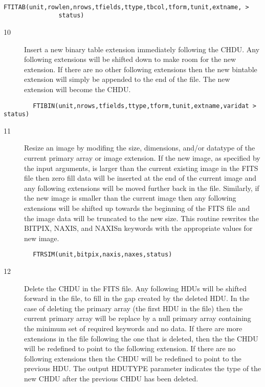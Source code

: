 \documentclass[11pt]{book}
\begin{document}
\begin{verbatim}
        FTITAB(unit,rowlen,nrows,tfields,ttype,tbcol,tform,tunit,extname, >
               status)
\end{verbatim}

\begin{description}
\item[10]  Insert a new binary table extension immediately following the CHDU.
    Any following extensions will be shifted down to make room for
    the new extension.  If there are no other following extensions
    then the new bintable extension will simply be appended to the
   end of the file.  The new extension will become the CHDU.
\end{description}

\begin{verbatim}
        FTIBIN(unit,nrows,tfields,ttype,tform,tunit,extname,varidat > status)
\end{verbatim}

\begin{description}
\item[11]  Resize an image by modifing the size, dimensions, and/or datatype of the
    current primary array or image extension. If the new image, as specified
    by the input arguments, is larger than the current existing image
    in the FITS file then zero fill data will be inserted at the end
    of the current image and any following extensions will be moved
    further back in the file.  Similarly, if the new image is
    smaller than the current image then any following extensions
    will be shifted up towards the beginning of the FITS file
    and the image data will be truncated to the new size.
    This routine rewrites the BITPIX, NAXIS, and NAXISn keywords
   with the appropriate values for new image.
\end{description}

\begin{verbatim}
        FTRSIM(unit,bitpix,naxis,naxes,status)
\end{verbatim}

\begin{description}
\item[12] Delete the CHDU in the FITS file.  Any following HDUs will be shifted
    forward in the file, to fill in the gap created by the deleted
    HDU.  In the case of deleting the primary array (the first HDU in
    the file) then the current primary array will be replace by a null
    primary array containing the minimum set of required keywords and
    no data.  If there are more extensions in the file following the
    one that is deleted, then the the CHDU will be redefined to point
    to the following extension.  If there are no following extensions
    then the CHDU will be redefined to point to the previous HDU.  The
    output HDUTYPE parameter indicates the type of the new CHDU after
   the previous CHDU has been deleted.
\end{description}
\end{document}
